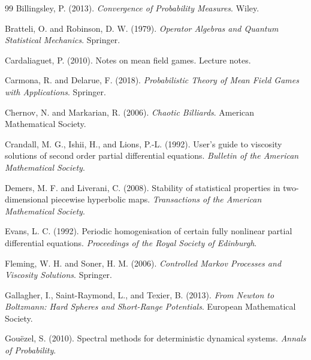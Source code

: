 \documentclass[12pt, letterpaper]{amsart}
\theoremstyle{plain}
\theoremstyle{definition}
\theoremstyle{remark}
\begin{document}
\begin{thebibliography}{99}
Billingsley, P. (2013).
\newblock \emph{Convergence of Probability Measures}.
\newblock Wiley.

Bratteli, O. and Robinson, D. W. (1979).
\newblock \emph{Operator Algebras and Quantum Statistical Mechanics}.
\newblock Springer.

Cardaliaguet, P. (2010).
\newblock Notes on mean field games.
\newblock Lecture notes.

Carmona, R. and Delarue, F. (2018).
\newblock \emph{Probabilistic Theory of Mean Field Games with Applications}.
\newblock Springer.

Chernov, N. and Markarian, R. (2006).
\newblock \emph{Chaotic Billiards}.
\newblock American Mathematical Society.

Crandall, M. G., Ishii, H., and Lions, P.-L. (1992).
\newblock User's guide to viscosity solutions of second order partial differential equations.
\newblock \emph{Bulletin of the American Mathematical Society}.

Demers, M. F. and Liverani, C. (2008).
\newblock Stability of statistical properties in two-dimensional piecewise hyperbolic maps.
\newblock \emph{Transactions of the American Mathematical Society}.

Evans, L. C. (1992).
\newblock Periodic homogenisation of certain fully nonlinear partial differential equations.
\newblock \emph{Proceedings of the Royal Society of Edinburgh}.

Fleming, W. H. and Soner, H. M. (2006).
\newblock \emph{Controlled Markov Processes and Viscosity Solutions}.
\newblock Springer.

Gallagher, I., Saint-Raymond, L., and Texier, B. (2013).
\newblock \emph{From Newton to Boltzmann: Hard Spheres and Short-Range Potentials}.
\newblock European Mathematical Society.

Gou\"ezel, S. (2010).
\newblock Spectral methods for deterministic dynamical systems.
\newblock \emph{Annals of Probability}.


\end{thebibliography}
\end{document}

